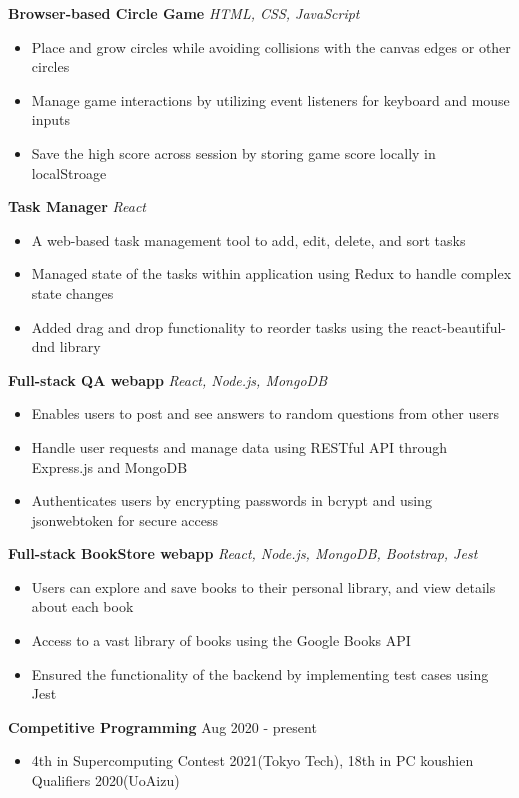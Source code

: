 \documentclass[a4paper,12pt]{article}
\begin{document}
\textbf{Browser-based Circle Game}
\href{https://uliba3.github.io/CircleGame/}{\faGlobe}
\href{https://github.com/uliba3/CircleGame}{\faGithub}
\textit{HTML, CSS, JavaScript}
\begin{itemize}
    \item Place and grow circles while avoiding collisions with the canvas edges or other circles
    \item Manage game interactions by utilizing event listeners for keyboard and mouse inputs
    \item Save the high score across session by storing game score locally in localStroage
\end{itemize}
\textbf{Task Manager}
\href{https://uliba3.github.io/TaskManager/}{\faGlobe}
\href{https://github.com/uliba3/TaskManager}{\faGithub}
\textit{React}
\begin{itemize}
    \item A web-based task management tool to add, edit, delete, and sort tasks
    \item Managed state of the tasks within application using Redux to handle complex state changes
    \item Added drag and drop functionality to reorder tasks using the react-beautiful-dnd library
\end{itemize}
\textbf{Full-stack QA webapp}
\href{https://white-voice-4708.fly.dev/}{\faGlobe}
\href{https://github.com/uliba3/Q-A-backend}{\faGithub}
\textit{React, Node.js, MongoDB}
\begin{itemize}
    \item Enables users to post and see answers to random questions from other users
    \item Handle user requests and manage data using RESTful API through Express.js and MongoDB
    \item Authenticates users by encrypting passwords in bcrypt and using jsonwebtoken for secure access
\end{itemize}
\textbf{Full-stack BookStore webapp}
\href{https://bookstore-backend.fly.dev/}{\faGlobe}
\href{https://github.com/uliba3/BookStore-backend}{\faGithub}
\textit{React, Node.js, MongoDB, Bootstrap, Jest}
\begin{itemize}
    \item Users can explore and save books to their personal library, and view details about each book
    \item Access to a vast library of books using the Google Books API
    \item Ensured the functionality of the backend by implementing test cases using Jest
\end{itemize}

\textbf{Competitive Programming} \hfill \textnormal{Aug 2020 - present}
\begin{itemize}
    \item 4th in Supercomputing Contest 2021(Tokyo Tech), 18th in PC koushien Qualifiers 2020(UoAizu)
\end{itemize}
\end{document}
